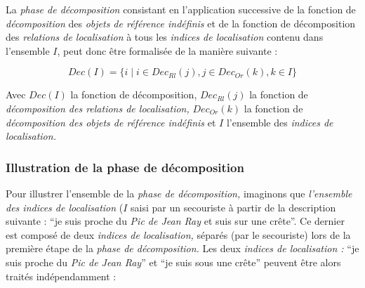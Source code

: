 La \emph{phase de décomposition} consistant en l’application
successive de la fonction de \emph{décomposition} des \emph{objets de
  référence indéfinis} et de la fonction de décomposition des
\emph{relations de localisation} à tous les \emph{indices de
  localisation} contenu dans l'ensemble \(I\), peut donc être
formalisée de la manière suivante :

\begin{equation}
  Dec(I) = \{ i \mid i \in Dec_{Rl}(j), j \in  Dec_{Or}(k), k \in I\} 
\end{equation}

Avec \(Dec(I)\) la fonction de décomposition, \(Dec_{Rl}(j)\) la
fonction de \emph{décomposition des relations de localisation,}
\(Dec_{Or}(k)\) la fonction de \emph{décomposition des objets de
  référence indéfinis }et \(I\) l'ensemble des \emph{indices de
  localisation.}

\subsubsection{Illustration de la phase de décomposition}
\label{subsec:4-3-3-4}

Pour illustrer l'ensemble de la \emph{phase de décomposition,}
imaginons que \emph{l'ensemble des indices de localisation} (\(I\)
saisi par un secouriste à partir de la description suivante :
\enquote{je suis proche du \emph{Pic de Jean Ray} et suis sur une
  crête}. Ce dernier est composé de deux \emph{indices de
  localisation,} séparés (par le secouriste) lors de la première étape
de la \emph{phase de décomposition.} Les deux \emph{indices de
  localisation :} \enquote{je suis proche du \emph{Pic de Jean Ray}}
et \enquote{je suis sous une crête} peuvent être alors traités
indépendamment :

\begin{quote}
\end{quote}

